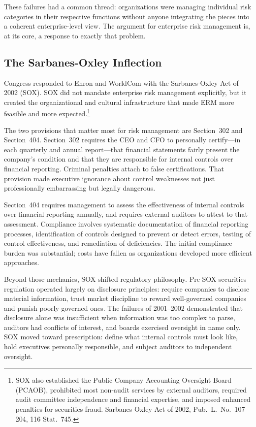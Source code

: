 \documentclass[11pt,openany]{book}
\begin{document}
These failures had a common thread: organizations were managing individual risk categories in their respective functions without anyone integrating the pieces into a coherent enterprise-level view. The argument for enterprise risk management is, at its core, a response to exactly that problem.

\subsection{The Sarbanes-Oxley Inflection}
\label{subsec:sox}

Congress responded to Enron and WorldCom with the Sarbanes-Oxley Act of 2002 (SOX). SOX did not mandate enterprise risk management explicitly, but it created the organizational and cultural infrastructure that made ERM more feasible and more expected.\footnote{SOX also established the Public Company Accounting Oversight Board (PCAOB), prohibited most non-audit services by external auditors, required audit committee independence and financial expertise, and imposed enhanced penalties for securities fraud. Sarbanes-Oxley Act of 2002, Pub.\ L.\ No.\ 107-204, 116 Stat.\ 745.}

The two provisions that matter most for risk management are Section~302 and Section~404. Section~302 requires the CEO and CFO to personally certify---in each quarterly and annual report---that financial statements fairly present the company's condition and that they are responsible for internal controls over financial reporting. Criminal penalties attach to false certifications. That provision made executive ignorance about control weaknesses not just professionally embarrassing but legally dangerous.

Section~404 requires management to assess the effectiveness of internal controls over financial reporting annually, and requires external auditors to attest to that assessment. Compliance involves systematic documentation of financial reporting processes, identification of controls designed to prevent or detect errors, testing of control effectiveness, and remediation of deficiencies. The initial compliance burden was substantial; costs have fallen as organizations developed more efficient approaches.

Beyond those mechanics, SOX shifted regulatory philosophy. Pre-SOX securities regulation operated largely on disclosure principles: require companies to disclose material information, trust market discipline to reward well-governed companies and punish poorly governed ones. The failures of 2001--2002 demonstrated that disclosure alone was insufficient when information was too complex to parse, auditors had conflicts of interest, and boards exercised oversight in name only. SOX moved toward prescription: define what internal controls must look like, hold executives personally responsible, and subject auditors to independent oversight.
\end{document}
